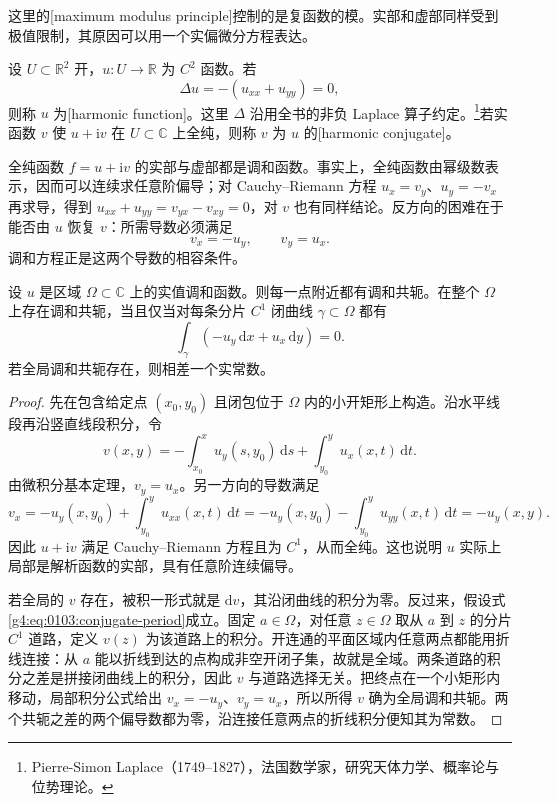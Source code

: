 这里的[maximum modulus principle]控制的是复函数的模。实部和虚部同样受到极值限制，其原因可以用一个实偏微分方程表达。

\begin{definition}
	\label{g4:def:0103:harmonic}
	设 \(U\subset\mathbb R^2\) 开，\(u\colon U\rightarrow\mathbb R\) 为 \(C^2\) 函数。若
	\[
		\Delta u=-(u_{xx}+u_{yy})=0,
	\]
	则称 \(u\) 为[harmonic function]。这里 \(\Delta\) 沿用全书的非负 Laplace 算子约定。\footnote{Pierre-Simon Laplace（1749--1827），法国数学家，研究天体力学、概率论与位势理论。}若实函数 \(v\) 使 \(u+\mathrm{i}v\) 在 \(U\subset\mathbb C\) 上全纯，则称 \(v\) 为 \(u\) 的[harmonic conjugate]。
\end{definition}

全纯函数 \(f=u+\mathrm{i}v\) 的实部与虚部都是调和函数。事实上，全纯函数由幂级数表示，因而可以连续求任意阶偏导；对 Cauchy–Riemann 方程 \(u_x=v_y\)、\(u_y=-v_x\) 再求导，得到 \(u_{xx}+u_{yy}=v_{yx}-v_{xy}=0\)，对 \(v\) 也有同样结论。反方向的困难在于能否由 \(u\) 恢复 \(v\)：所需导数必须满足
\[
	v_x=-u_y,\qquad v_y=u_x.
\]
调和方程正是这两个导数的相容条件。

\begin{proposition}
	\label{g4:prop:0103:harmonic-conjugate}
	设 \(u\) 是区域 \(\Omega\subset\mathbb C\) 上的实值调和函数。则每一点附近都有调和共轭。在整个 \(\Omega\) 上存在调和共轭，当且仅当对每条分片 \(C^1\) 闭曲线 \(\gamma\subset\Omega\) 都有
	\begin{equation}
		\label{g4:eq:0103:conjugate-period}
		\int_\gamma(-u_y\,\mathrm{d}x+u_x\,\mathrm{d}y)=0.
	\end{equation}
	若全局调和共轭存在，则相差一个实常数。
\end{proposition}

\begin{proof}
	先在包含给定点 \((x_0,y_0)\) 且闭包位于 \(\Omega\) 内的小开矩形上构造。沿水平线段再沿竖直线段积分，令
	\[
		v(x,y)=-\int_{x_0}^{x}u_y(s,y_0)\,\mathrm{d}s
		+\int_{y_0}^{y}u_x(x,t)\,\mathrm{d}t.
	\]
	由微积分基本定理，\(v_y=u_x\)。另一方向的导数满足
	\[
		v_x=-u_y(x,y_0)+\int_{y_0}^{y}u_{xx}(x,t)\,\mathrm{d}t
		=-u_y(x,y_0)-\int_{y_0}^{y}u_{yy}(x,t)\,\mathrm{d}t
		=-u_y(x,y).
	\]
	因此 \(u+\mathrm{i}v\) 满足 Cauchy–Riemann 方程且为 \(C^1\)，从而全纯。这也说明 \(u\) 实际上局部是解析函数的实部，具有任意阶连续偏导。

	若全局的 \(v\) 存在，被积一形式就是 \(\mathrm{d}v\)，其沿闭曲线的积分为零。反过来，假设式\eqref{g4:eq:0103:conjugate-period}成立。固定 \(a\in\Omega\)，对任意 \(z\in\Omega\) 取从 \(a\) 到 \(z\) 的分片 \(C^1\) 道路，定义 \(v(z)\) 为该道路上的积分。开连通的平面区域内任意两点都能用折线连接：从 \(a\) 能以折线到达的点构成非空开闭子集，故就是全域。两条道路的积分之差是拼接闭曲线上的积分，因此 \(v\) 与道路选择无关。把终点在一个小矩形内移动，局部积分公式给出 \(v_x=-u_y\)、\(v_y=u_x\)，所以所得 \(v\) 确为全局调和共轭。两个共轭之差的两个偏导数都为零，沿连接任意两点的折线积分便知其为常数。
\end{proof}

